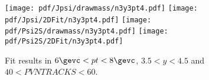 \begin{figure}[H]
\begin{center}
\texttt{[image: pdf/Jpsi/drawmass/n3y3pt4.pdf]}
\texttt{[image: pdf/Jpsi/2DFit/n3y3pt4.pdf]}
\vspace*{-0.5cm}
\texttt{[image: pdf/Psi2S/drawmass/n3y3pt4.pdf]}
\texttt{[image: pdf/Psi2S/2DFit/n3y3pt4.pdf]}
\vspace*{-0.5cm}
\end{center}
\caption{Fit results in $6\gevc<pt<8\gevc$, $3.5<y<4.5$ and $40<PVNTRACKS<60$.}
\label{Fitn3y3pt4}
\end{figure}
